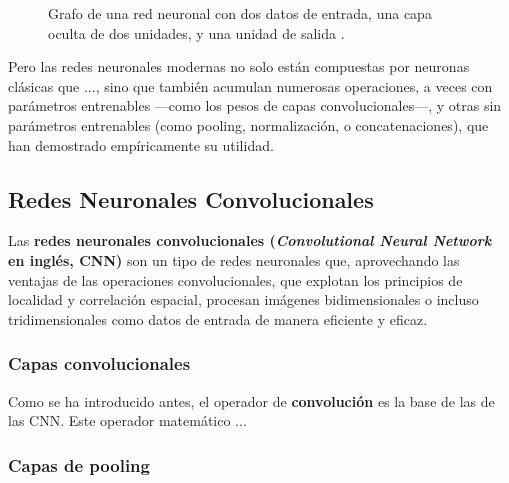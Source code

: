 \begin{figure}[h]
    \caption{Grafo de una red neuronal con dos datos de entrada, una capa oculta de dos unidades, y una unidad de salida \cite{rusell2021}.}
    \label{fig:neural_network}
\end{figure}




Pero las redes neuronales modernas no solo están compuestas por neuronas clásicas que ..., sino que también
acumulan numerosas operaciones, a veces con parámetros entrenables ---como los pesos de capas convolucionales---, 
y otras sin parámetros entrenables (como pooling, normalización, o concatenaciones), que han demostrado 
empíricamente su utilidad.






\subsection{Redes Neuronales Convolucionales}

Las \textbf{redes neuronales convolucionales (\textit{Convolutional Neural Network} en inglés, CNN)} son un tipo de
redes neuronales que, aprovechando las ventajas de las operaciones convolucionales, que explotan los principios de 
localidad y correlación espacial, procesan imágenes bidimensionales o incluso tridimensionales como datos de entrada
de manera eficiente y eficaz.



\subsubsection{Capas convolucionales}

Como se ha introducido antes, el operador de \textbf{convolución} es la base de las de las CNN. Este operador 
matemático ...




\subsubsection{Capas de pooling}




